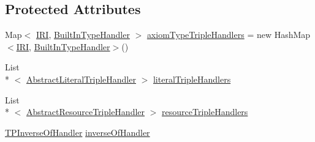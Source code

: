 \subsection*{Protected Attributes}
\begin{DoxyCompactItemize}
\item 
Map$<$ \hyperlink{classorg_1_1semanticweb_1_1owlapi_1_1model_1_1_i_r_i}{I\-R\-I}, \hyperlink{classorg_1_1coode_1_1owlapi_1_1rdfxml_1_1parser_1_1_built_in_type_handler}{Built\-In\-Type\-Handler} $>$ \hyperlink{classorg_1_1coode_1_1owlapi_1_1rdfxml_1_1parser_1_1_o_w_l_r_d_f_consumer_a1635998f095ffa0a1a452d76edb2c327}{axiom\-Type\-Triple\-Handlers} = new Hash\-Map$<$\hyperlink{classorg_1_1semanticweb_1_1owlapi_1_1model_1_1_i_r_i}{I\-R\-I}, \hyperlink{classorg_1_1coode_1_1owlapi_1_1rdfxml_1_1parser_1_1_built_in_type_handler}{Built\-In\-Type\-Handler}$>$()
\item 
List\\*
$<$ \hyperlink{classorg_1_1coode_1_1owlapi_1_1rdfxml_1_1parser_1_1_abstract_literal_triple_handler}{Abstract\-Literal\-Triple\-Handler} $>$ \hyperlink{classorg_1_1coode_1_1owlapi_1_1rdfxml_1_1parser_1_1_o_w_l_r_d_f_consumer_a572d3df3e8d5aeba929bfb8f20c98801}{literal\-Triple\-Handlers}
\item 
List\\*
$<$ \hyperlink{classorg_1_1coode_1_1owlapi_1_1rdfxml_1_1parser_1_1_abstract_resource_triple_handler}{Abstract\-Resource\-Triple\-Handler} $>$ \hyperlink{classorg_1_1coode_1_1owlapi_1_1rdfxml_1_1parser_1_1_o_w_l_r_d_f_consumer_a25bcaaf0ada9aa7ba6022d8a0a715fee}{resource\-Triple\-Handlers}
\item 
\hyperlink{classorg_1_1coode_1_1owlapi_1_1rdfxml_1_1parser_1_1_t_p_inverse_of_handler}{T\-P\-Inverse\-Of\-Handler} \hyperlink{classorg_1_1coode_1_1owlapi_1_1rdfxml_1_1parser_1_1_o_w_l_r_d_f_consumer_a79e3cdccee8881d0e983e3aad28f335e}{inverse\-Of\-Handler}
\end{DoxyCompactItemize}
